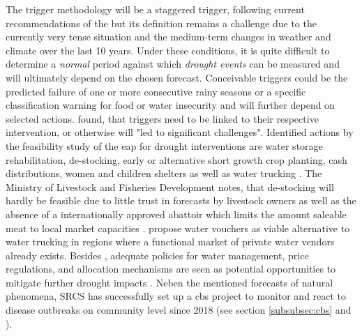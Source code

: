The trigger methodology will be a staggered trigger, following current recommendations of the \autocite{rcrcFORECASTBASEDFINANCINGEARLY2020} but its definition remains a challenge due to the currently very tense situation and the medium-term changes in weather and climate over the last 10 years. Under these conditions, it is quite difficult to determine a \textit{normal} period against which \textit{drought events} can be measured and will ultimately depend on the chosen forecast. Conceivable triggers could be the predicted failure of one or more consecutive rainy seasons or a specific classification warning for food or water insecurity and will further depend on selected actions. \autocite[19]{gettliffeOCHAAnticipatoryAction2021} found, that triggers need to be linked to their respective intervention, or otherwise will "led to significant challenges".\newline
Identified actions by the feasibility study of the \acrshort{eap} for drought interventions are water storage rehabilitation, de-stocking, early or alternative short growth crop planting, cash distributions, women and children shelters as well as water trucking \autocite{somaliredcrescentsocietyFeasibilityStudyPotential2022}. The Ministry of Livestock and Fisheries Development notes, that de-stocking will hardly be feasible due to little trust in forecasts by livestock owners as well as the absence of a internationally approved abattoir which limits the amount saleable meat to local market capacities \autocite{somaliredcrescentsocietyFeasibilityStudyPotential2022}. \autocite{gualazziniEWEAEarlyWarning2021} propose water vouchers as viable alternative to water trucking in regions where a functional market of private water vendors already exists. Besides , adequate policies for water management, price regulations, and allocation mechanisms are seen as potential opportunities to mitigate further drought impacts \autocite{gualazziniEWEAEarlyWarning2021,wangPropagationDroughtMeteorological2016}.\newline
Neben the mentioned forecasts of natural phenomena, SRCS has successfully set up a \acrshort{cbs} project to monitor and react to disease outbreaks on community level since 2018 (see section \ref{subsubsec:cbs} and \autocite{jungCommunityBasedSurveillance2022}). 


